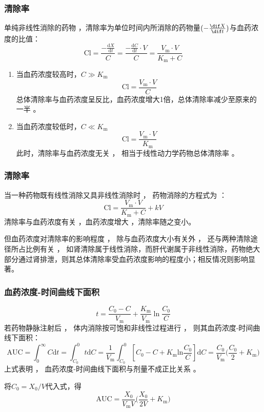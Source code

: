 \documentclass[dvipsnames, svgnames, x11names]{beamer}
\begin{document}
\begin{frame}
    \frametitle{清除率}
    单纯非线性消除的药物 ，清除率为单位时间内所消除的药物量$(-\frac{\dif X}{\dif t})$与血药浓度的比值：
    \[
            \mathrm{Cl}=\frac{-\frac{\mathrm{d}X}{\mathrm{d}t}}C=\frac{-\frac{\mathrm{d}C}{\mathrm{d}t}\cdot V}{C}=\frac{V_{\mathrm{m}}\cdot V}{K_{\mathrm{m}}+C}
    \]
    \begin{enumerate}
      \item 当血药浓度较高时，$C\gg K_{\mathrm{m}}$
      \[
        \mathrm{Cl}=\frac{V_{\mathrm{m}}\cdot V}{C}
      \]
      总体清除率与血药浓度呈反比，血药浓度增大1倍，总体清除率减少至原来的一半 。
      \item 当血药浓度较低时，$C\ll K_{\mathrm{m}}$
      \[
        \mathrm{Cl}=\frac{V_{\mathrm{m}}\cdot V}{K_{\mathrm{m}}}
      \]
      此时，清除率与血药浓度无关 ， 相当于线性动力学药物总体清除率 。
    \end{enumerate}
\end{frame}


\begin{frame}
    \frametitle{清除率}
    当一种药物既有线性消除又具非线性消除时 ， 药物消除的方程式为 ：
    \[
        \mathrm{Cl}=\frac{V_{\mathrm{m}}\cdot V}{K_{\mathrm{m}}+C} +kV
    \]
    清除率与血药浓度有关 ，血药浓度增大 ，清除率随之变小。 
    
    但血药浓度对清除率的影响程度 ， 除与血药浓度大小有关外 ， 还与两种清除途径所占比例有关 ， 如肾清除属于线性消除，而肝代谢属于非线性消除，药物绝大部分通过肾排泄，则其总体清除率受血药浓度影响的程度小；相反情况则影响显著。
\end{frame}


\begin{frame}
    \frametitle{血药浓度-时间曲线下面积}
    \[
        t=\frac{C_0-C}{V_{\mathrm{m}}}+\frac{K_{\mathrm{m}}}{V_{\mathrm{m}}}{\ln\frac{C_0}C}
    \]
    若药物静脉注射后 ， 体内消除按可饱和非线性过程进行 ， 则其血药浓度-时间曲线下面积：
    \[
        \mathrm{AUC}=\int_{0}^{\infty}C\mathrm{d}t=\int_{C_0}^{0}t\mathrm{d}C=\frac{1}{V_{\mathrm{m}}}\int_{C_{0}}^{0}\left[C_{0}-C+K_{\mathrm{m}}\mathrm{ln}\frac{C_{0}}{C}\right]\mathrm{d}C=\frac{C_{0}}{V_{\mathrm{m}}}\biggl(\frac{C_{0}}{2}+K_{\mathrm{m}}\biggr)
    \]
    上式表明 ， 血药浓度-时间曲线下面积与剂量不成正比关系 。

    将$C_0=X_0/V$代入式，得
    \[
        \mathrm{AUC}=\frac{X_{0}}{V_{\mathrm{m}}V}\biggl(\frac{X_{0}}{2V}+K_{\mathrm{m}}\biggr)
    \]
\end{frame}
\end{document}
